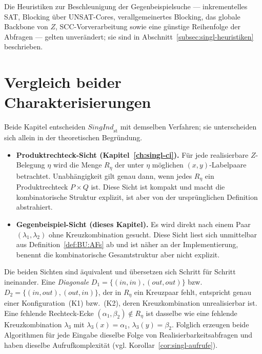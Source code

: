 Die Heuristiken zur Beschleunigung der Gegenbeispielsuche --- inkrementelles
SAT, Blocking über UNSAT-Cores, verallgemeinertes Blocking, das globale
Backbone von \(Z\), SCC-Vorverarbeitung sowie eine günstige Reihenfolge der
Abfragen --- gelten unverändert; sie sind in
Abschnitt~\ref{subsec:singl-heuristiken} beschrieben.

\section{Vergleich beider Charakterisierungen}
\label{sec:singl-direkt-vergleich}

Beide Kapitel entscheiden \(\textit{SingInd}_{\mathrm{st}}\) mit demselben
Verfahren; sie unterscheiden sich allein in der theoretischen Begründung.

\begin{itemize}
    \item \textbf{Produktrechteck-Sicht (Kapitel~\ref{ch:singl-ci}).} Für jede
    realisierbare \(Z\)-Belegung \(\eta\) wird die Menge \(R_\eta\) der unter
    \(\eta\) möglichen \((x,y)\)-Labelpaare betrachtet. Unabhängigkeit gilt
    genau dann, wenn jedes \(R_\eta\) ein Produktrechteck \(P\times Q\) ist.
    Diese Sicht ist kompakt und macht die kombinatorische Struktur explizit,
    ist aber von der ursprünglichen Definition abstrahiert.

    \item \textbf{Gegenbeispiel-Sicht (dieses Kapitel).} Es wird direkt nach
    einem Paar \((\lambda_1,\lambda_2)\) ohne Kreuzkombination gesucht. Diese
    Sicht liest sich unmittelbar aus Definition~\ref{def:BU:AFs} ab und ist
    näher an der Implementierung, benennt die kombinatorische Gesamtstruktur
    aber nicht explizit.
\end{itemize}

Die beiden Sichten sind äquivalent und übersetzen sich Schritt für Schritt
ineinander. Eine \emph{Diagonale} \(D_1=\{(\mathit{in},\mathit{in}),
(\mathit{out},\mathit{out})\}\) bzw. \(D_2=\{(\mathit{in},\mathit{out}),
(\mathit{out},\mathit{in})\}\), der in \(R_\eta\) ein Kreuzpaar fehlt,
entspricht genau einer Konfiguration~(K1) bzw.~(K2), deren Kreuzkombination
unrealisierbar ist. Eine fehlende Rechteck-Ecke \((\alpha_1,\beta_2)\notin
R_\eta\) ist dasselbe wie eine fehlende Kreuzkombination \(\lambda_3\) mit
\(\lambda_3(x)=\alpha_1\), \(\lambda_3(y)=\beta_2\). Folglich erzeugen beide
Algorithmen für jede Eingabe dieselbe Folge von Realisierbarkeitsabfragen und
haben dieselbe Aufrufkomplexität (vgl.
Korollar~\ref{cor:singl-aufrufe}).
